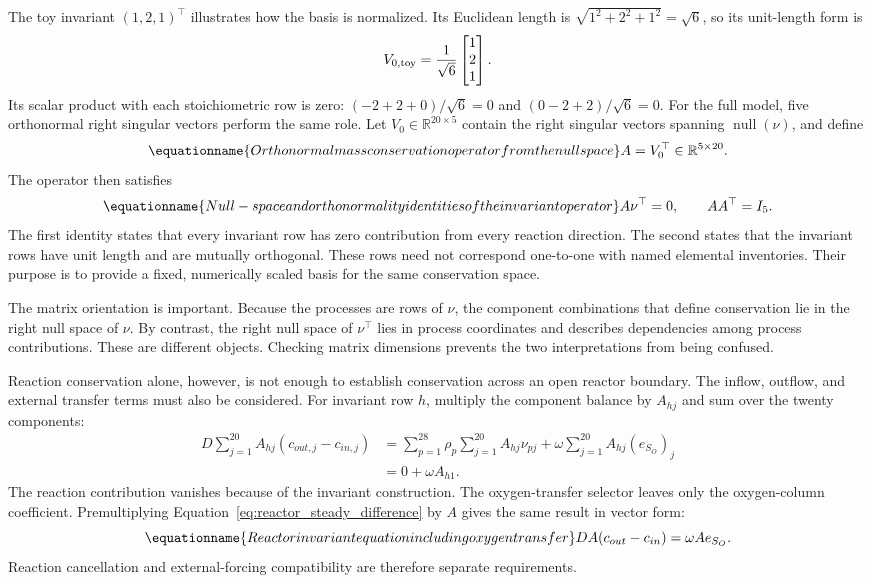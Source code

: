 The toy invariant $(1,2,1)^\top$ illustrates how the basis is normalized. Its Euclidean length is $\sqrt{1^2+2^2+1^2}=\sqrt6$, so its unit-length form is
\[
V_{0,\rm toy}=\frac1{\sqrt6}\begin{bmatrix}1\\2\\1\end{bmatrix}.
\]
Its scalar product with each stoichiometric row is zero:
$(-2+2+0)/\sqrt6=0$ and $(0-2+2)/\sqrt6=0$.
For the full model, five orthonormal right singular vectors perform the same role. Let $V_0\in\mathbb{R}^{20\times5}$ contain the right singular vectors spanning $\operatorname{null}(\nu)$, and define
\begin{equation}
\equationname{Orthonormal mass conservation operator from the null space}
A=V_0^\top\in\mathbb{R}^{5\times20}.
\label{eq:invariant_basis_definition}
\end{equation}
The operator then satisfies
\begin{equation}
\equationname{Null-space and orthonormality identities of the invariant operator}
A\nu^\top=0,\qquad AA^\top=I_5.
\label{eq:invariant_basis_properties}
\end{equation}
The first identity states that every invariant row has zero contribution from every reaction direction. The second states that the invariant rows have unit length and are mutually orthogonal. These rows need not correspond one-to-one with named elemental inventories. Their purpose is to provide a fixed, numerically scaled basis for the same conservation space.

The matrix orientation is important. Because the processes are rows of $\nu$, the component combinations that define conservation lie in the right null space of $\nu$. By contrast, the right null space of $\nu^\top$ lies in process coordinates and describes dependencies among process contributions. These are different objects. Checking matrix dimensions prevents the two interpretations from being confused.

Reaction conservation alone, however, is not enough to establish conservation across an open reactor boundary. The inflow, outflow, and external transfer terms must also be considered. For invariant row $h$, multiply the component balance by $A_{hj}$ and sum over the twenty components:
\[
\begin{aligned}
D\sum_{j=1}^{20}A_{hj}(c_{out,j}-c_{in,j})
&=\sum_{p=1}^{28}\rho_p\sum_{j=1}^{20}A_{hj}\nu_{pj}
+\omega\sum_{j=1}^{20}A_{hj}(e_{S_O})_j\\
&=0+\omega A_{h1}.
\end{aligned}
\]
The reaction contribution vanishes because of the invariant construction. The oxygen-transfer selector leaves only the oxygen-column coefficient. Premultiplying Equation~\eqref{eq:reactor_steady_difference} by $A$ gives the same result in vector form:
\begin{equation}
\equationname{Reactor invariant equation including oxygen transfer}
D A(c_{out}-c_{in})=\omega A e_{S_O}.
\label{eq:invariant_boundary_balance}
\end{equation}
Reaction cancellation and external-forcing compatibility are therefore separate requirements.

